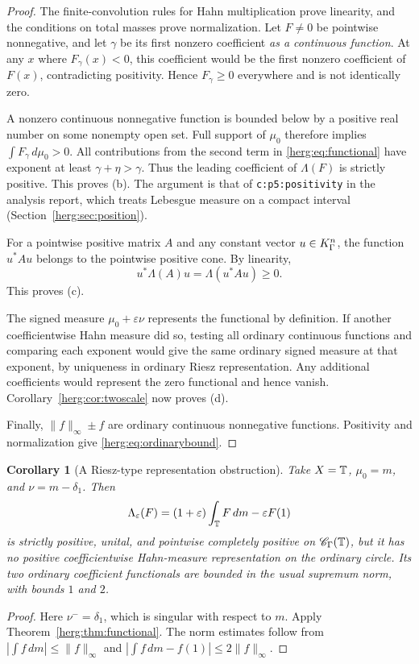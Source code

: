 \documentclass[11pt,letterpaper]{article}
\newtheorem{corollary}[theorem]{Corollary}
\theoremstyle{definition}
\newcommand{\CH}{\mathscr C_\Gamma}
\newcommand{\eps}{\varepsilon}
\newcommand{\dd}{\,d}
\newcommand{\lbl}[1]{\nolinkurl{#1}}%
\numberwithin{equation}{section}
\begin{document}
\begin{proof}
The finite-convolution rules for Hahn multiplication prove linearity, and the conditions on total masses prove normalization. Let $F\ne0$ be pointwise nonnegative, and let $\gamma$ be its first nonzero coefficient \emph{as a continuous function}. At any $x$ where $F_\gamma(x)<0$, this coefficient would be the first nonzero coefficient of $F(x)$, contradicting positivity. Hence $F_\gamma\ge0$ everywhere and is not identically zero.

A nonzero continuous nonnegative function is bounded below by a positive real number on some nonempty open set. Full support of $\mu_0$ therefore implies $\int F_\gamma\dd\mu_0>0$. All contributions from the second term in \eqref{herg:eq:functional} have exponent at least $\gamma+\eta>\gamma$. Thus the leading coefficient of $\Lambda(F)$ is strictly positive. This proves (b). The argument is that of \lbl{c:p5:positivity} in the analysis report, which treats Lebesgue measure on a compact interval (Section~\ref{herg:sec:position}).

For a pointwise positive matrix $A$ and any constant vector $u\in K_\Gamma^n$, the function $u^*Au$ belongs to the pointwise positive cone. By linearity,
\[
 u^*\Lambda(A)u=\Lambda(u^*Au)\ge0.
\]
This proves (c).

The signed measure $\mu_0+\eps\nu$ represents the functional by definition. If another coefficientwise Hahn measure did so, testing all ordinary continuous functions and comparing each exponent would give the same ordinary signed measure at that exponent, by uniqueness in ordinary Riesz representation. Any additional coefficients would represent the zero functional and hence vanish. Corollary~\ref{herg:cor:twoscale} now proves (d).

Finally, $\|f\|_\infty\pm f$ are ordinary continuous nonnegative functions. Positivity and normalization give \eqref{herg:eq:ordinarybound}.
\end{proof}

\begin{corollary}[A Riesz-type representation obstruction]\label{herg:cor:rieszfailure}
Take $X=\mathbb T$, $\mu_0=m$, and $\nu=m-\delta_1$. Then
\begin{equation}\label{herg:eq:Rieszfailure}
 \Lambda_\eps(F)=(1+\eps)\int_\T F\dd m-\eps F(1)
\end{equation}
is strictly positive, unital, and pointwise completely positive on $\CH(\T)$, but it has no positive coefficientwise Hahn-measure representation on the ordinary circle. Its two ordinary coefficient functionals are bounded in the usual supremum norm, with bounds $1$ and $2$.
\end{corollary}
\begin{proof}
Here $\nu^-=\delta_1$, which is singular with respect to $m$. Apply Theorem~\ref{herg:thm:functional}. The norm estimates follow from $|\int f\dd m|\le\|f\|_\infty$ and $|\int f\dd m-f(1)|\le2\|f\|_\infty$.
\end{proof}
\end{document}
